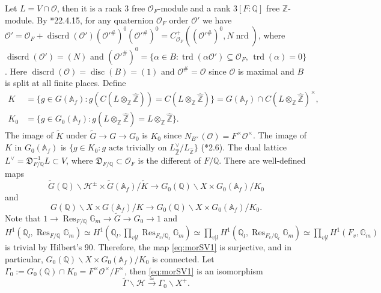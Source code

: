 \documentclass{amsart}
\numberwithin{equation}{subsection}
\numberwithin{theorem}{section}
\theoremstyle{definition}
\theoremstyle{remark}
\newcommand{\bA}{\mathbb{A}}
\newcommand{\bG}{\mathbb{G}}
\newcommand{\bQ}{\mathbb{Q}}
\newcommand{\bZ}{\mathbb{Z}}
\newcommand{\cH}{\mathcal{H}}
\newcommand{\cO}{\mathcal{O}}
\newcommand{\fD}{\mathfrak{D}}
\DeclareMathOperator{\trd}{trd}
\DeclareMathOperator{\nrd}{nrd}
\DeclareMathOperator{\discrd}{discrd}
\DeclareMathOperator{\disc}{disc}
\DeclareMathOperator{\Res}{Res}
\begin{document}
\subsubsection{}
Let $L =  V\cap \cO$, then it is a rank $3$ free $\cO_F$-module %
and a rank $3[F:\bQ]$ free $\bZ$-module. By \cite{MR4279905}*{22.4.15}, for any quaternion $\cO_F$ order $\cO'$ we have $\cO' = \cO_F + \discrd(\cO')(\cO'^{\#})^0(\cO'^{\#})^0 = C_{\cO_F}^+((\cO'^{\#})^0, N\nrd)$, where $\discrd(\cO') = (N)$ and $(\cO'^{\#})^0= \{\alpha\in B: \trd(\alpha \cO')\subseteq \cO_F, \, \trd(\alpha) = 0\}$. 
Here $\discrd(\cO) = \disc(B) =(1)$ and $\cO^{\#} = \cO$ since $\cO$ is maximal and $B$ is split at all finite places. 
Define \begin{align*}
    K &= \{g\in G(\bA_f) : g( C(L\otimes_{\bZ}\widehat{\bZ})) = C(L\otimes_{\bZ}\widehat{\bZ})\}=G(\bA_f)\cap C(L\otimes_{\bZ}\widehat{\bZ})^\times,\\
    K_0 &=\{g\in G_0(\bA_f): g(L\otimes_{\bZ}\widehat{\bZ}) = L\otimes_{\bZ}\widehat{\bZ}\}.
\end{align*}  
The image of $\widetilde{K}$ under $\widetilde{G} \to G\to G_0$ is $K_0$ since $N_{B^\times}(\cO) = F^\times \cO^\times$.
The image of $K$ in $G_0(\bA_f)$ is $\{g\in K_0: g \text{ acts trivially on } L^\vee_{\widehat{\bZ}}/L_{\widehat{\bZ}}\}$ (\cite{MR3484114}*{2.6}).
The dual lattice $L^\vee = \fD_{F/\bQ}^{-1}L \subset V$, where $\fD_{F/\bQ}\subset\cO_F$ is the different of $F/\bQ$. 
There are well-defined maps \begin{equation}\label{eq:morSV1}
    \widetilde{G}(\bQ)\backslash\cH^{\pm}\times \widetilde{G}(\bA_f)/\widetilde{K} \to G_0(\bQ)\backslash X \times G_0(\bA_f)/K_0
\end{equation} and \begin{equation}\label{eq:morSV2}
    G(\bQ)\backslash X\times G(\bA_f)/K \to G_0(\bQ)\backslash X \times G_0(\bA_f)/K_0.
\end{equation} Note that $1\to \Res_{F/\bQ} \bG_m \to \widetilde{G} \to G_0 \to 1$ and $H^1(\bQ_l, \Res_{F/\bQ}\bG_m) \simeq H^1(\bQ_l, \prod_{v|l} \Res_{F_v/\bQ_l}\bG_m) \simeq \prod_{v|l}H^1(\bQ_l, \Res_{F_v/\bQ_l}\bG_m)\simeq \prod_{v|l} H^1(F_v, \bG_m)$ is trivial by Hilbert's 90. Therefore, the map \eqref{eq:morSV1} is surjective, and in particular, $G_0(\bQ)\backslash X \times G_0(\bA_f)/K_0$ is connected. Let $\Gamma_0 := G_0(\bQ) \cap K_0 = F^\times \cO^\times/F^\times$, then \eqref{eq:morSV1} is an isomorphism \begin{equation} \label{eq:connmorSV1}\widetilde{\Gamma}\backslash \cH \xrightarrow{\simeq} \Gamma_0\backslash X^+.
\end{equation} 
\end{document}

